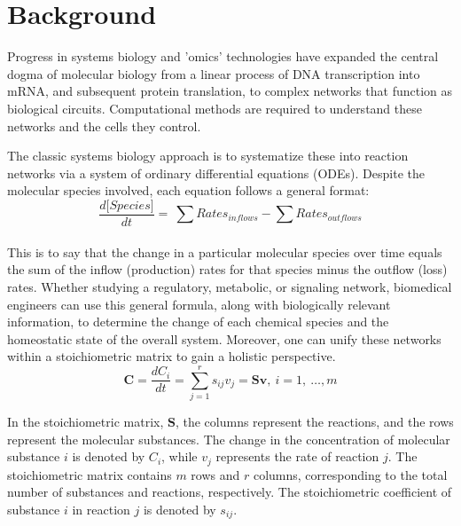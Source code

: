 \documentclass[conference]{IEEEtran}
\begin{document}
\section{Background}
Progress in systems biology and 'omics' technologies have expanded the central dogma of molecular biology from a linear process of DNA transcription into mRNA, and subsequent protein translation, to complex networks that function as biological circuits\cite{b3}. Computational methods are required to understand these networks and the cells they control. 

The classic systems biology approach is to systematize these into reaction networks via a system of ordinary differential equations (ODEs). Despite the molecular species involved, each equation follows a general format:
\begin{equation}
\frac{d\lbrack Species\rbrack}{dt} = \ \sum_{}^{}{Rates}_{inflows} - \sum_{}^{}{Rates}_{outflows}\label{eq1}
\end{equation}

This is to say that the change in a particular molecular species over time equals the sum of the inflow (production) rates for that species minus the outflow (loss) rates. Whether studying a regulatory, metabolic, or signaling network, biomedical engineers can use this general formula, along with biologically relevant information, to determine the change of each chemical species and the homeostatic state of the overall system. Moreover, one can unify these networks within a stoichiometric matrix to gain a holistic perspective.
\begin{equation}
\mathbf{C} = \frac{dC_{i}}{dt} = \sum_{j = 1}^{r}{s_{ij}v_{j} = \mathbf{Sv}},\ i = 1,\ \ldots,m\label{eq2}
\end{equation}

In the stoichiometric matrix, \begin{math}\mathbf{S}\end{math}, the columns represent the reactions, and the rows represent the molecular substances. The change in the concentration of molecular substance \begin{math}i\end{math} is denoted by \begin{math}C_{i}\end{math}, while \begin{math}v_{j}\end{math} represents the rate of reaction \begin{math}j\end{math}. The stoichiometric matrix contains \begin{math}m\end{math} rows and \begin{math}r\end{math} columns, corresponding to the total number of substances and reactions, respectively. The stoichiometric coefficient of substance \begin{math}i\end{math} in reaction \begin{math}j\end{math} is denoted by \begin{math}s_{ij}\end{math}.
\end{document}
